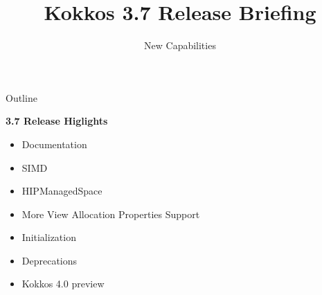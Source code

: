 
\usepackage{tikz}
\graphicspath{{3_7/figures/}}
\def\sandid{UPDATEME SAND2020-7755 PE}

\title{Kokkos 3.7 Release Briefing}

\author{New Capabilities}




\shorttrue
\mediumfalse
\fullfalse



\begin{frame}
	\titlepage
\end{frame}


\begin{frame}[fragile]{Outline}

\textbf{3.7 Release Higlights}

    \begin{itemize}
      \item{Documentation}
      \item{SIMD}
      \item{HIPManagedSpace}
      \item{More View Allocation Properties Support}
      \item{Initialization}
      \item{Deprecations}
      \item{Kokkos 4.0 preview}
    \end{itemize}

\end{frame}

